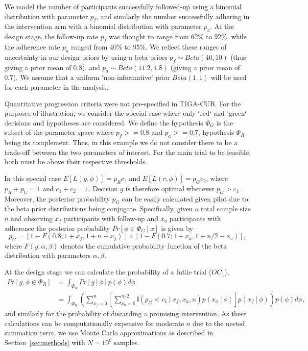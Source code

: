 \documentclass[AMA,STIX1COL]{WileyNJD-v2}
\begin{document}
We model the number of participants successfully followed-up using a binomial distribution with parameter $p_f$, and similarly the number successfully adhering in the intervention arm with a binomial distribution with parameter $p_a$. At the design stage, the follow-up rate $p_f$ was thought to range from 62\% to 92\%, while the adherence rate $p_a$ ranged from 40\% to 95\%. We reflect these ranges of uncertainty in our design priors by using a beta priors $p_f \sim Beta(40, 10)$ (thus giving a prior mean of 0.8), and $p_a \sim Beta(11.2, 4.8)$ (giving a prior mean of 0.7). We assume that a uniform `non-informative' prior $Beta(1,1)$ will be used for each parameter in the analysis.

Quantitative progression criteria were not pre-specified in TIGA-CUB. For the purposes of illustration, we consider the special case where only `red` and `green` decisions and hypotheses are considered. We define the hypothesis $\Phi_G$ is the subset of the parameter space where $p_f >= 0.8$ and $p_a >= 0.7$, hypothesis $\Phi_R$ being its complement. Thus, in this example we do not consider there to be a trade-off between the two parameters of interest. For the main trial to be feasible, both must be above their respective thresholds.

In this special case $E[L(g, \phi)] = p_R c_1$ and $E[L(r, \phi)] = p_G c_2$, where $p_R + p_G = 1$ and $c_1 + c_2 = 1$. Decision $g$ is therefore optimal whenever $p_G > c_1$. Moreover, the posterior probability $p_G$ can be easily calculated given pilot due to the beta prior distributions being conjugate. Specifically, given a total sample size $n$ and observing $x_f$ participants with follow-up and $x_a$ participants with adherence the posterior probability $Pr[\phi \in \Phi_G ~|~ x]$ is given by
\begin{equation}
p_G = [1 - F(0.8; 1+x_f, 1+n-x_f)] \times [1 - F(0.7; 1+x_a, 1 + n/2 - x_a)],
\end{equation}
where $F(y; \alpha, \beta)$ denotes the cumulative probability function of the beta distribution with parameters $\alpha, \beta$.

At the design stage we can calculate the probability of a futile trial ($OC_1$),
\begin{align}
Pr[g, \phi \in \Phi_R] &= \int_{\Phi_R} Pr[g ~|~ \phi] p(\phi) d\phi \\
 &= \int_{\Phi_R} \left( \sum_{x_f = 0}^{n} \left[ \sum_{x_a = 0}^{n/2}  \mathbb{I}(p_G < c_1 ~|~ x_f, x_a, n) p(x_a ~|~ \phi) \right]p(x_f ~|~ \phi) \right)p(\phi) d\phi,
\end{align}
and similarly for the probability of discarding a promising intervention. As these calculations can be computationally expensive for moderate $n$ due to the nested summation term, we use Monte Carlo approximations as described in Section~\ref{sec:methods} with $N=10^6$ samples.
\end{document}
